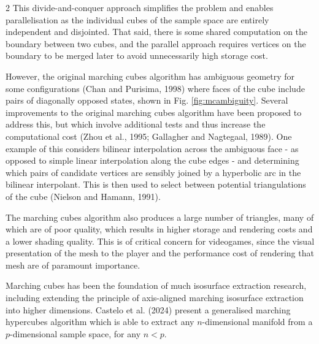 \documentclass[]{article}
\newenvironment{singlecolfigure}
  {\par\medskip\noindent\minipage{\linewidth}}
  {\endminipage\par\medskip}
\begin{document}
\begin{multicols}{2}
This divide-and-conquer approach simplifies the problem and enables parallelisation as the individual cubes of the sample space are entirely independent and disjointed. That said, there is some shared computation on the boundary between two cubes, and the parallel approach requires vertices on the boundary to be merged later to avoid unnecessarily high storage cost.

However, the original marching cubes algorithm has ambiguous geometry for some configurations (Chan and Purisima, 1998) where faces of the cube include pairs of diagonally opposed states, shown in Fig. \ref{fig:mcambiguity}. Several improvements to the original marching cubes algorithm have been proposed to address this, but which involve additional tests and thus increase the computational cost (Zhou et al., 1995; Gallagher and Nagtegaal, 1989). One example of this considers bilinear interpolation across the ambiguous face - as opposed to simple linear interpolation along the cube edges - and determining which pairs of candidate vertices are sensibly joined by a hyperbolic arc in the bilinear interpolant. This is then used to select between potential triangulations of the cube (Nielson and Hamann, 1991).

\begin{singlecolfigure}
    \centering
    
    \label{fig:mcambiguity}
\end{singlecolfigure}

\FloatBarrier

The marching cubes algorithm also produces a large number of triangles, many of which are of poor quality, which results in higher storage and rendering costs and a lower shading quality. This is of critical concern for videogames, since the visual presentation of the mesh to the player and the performance cost of rendering that mesh are of paramount importance.

Marching cubes has been the foundation of much isosurface extraction research, including extending the principle of axis-aligned marching isosurface extraction into higher dimensions. Castelo et al. (2024) present a generalised marching hypercubes algorithm which is able to
extract any $n$-dimensional manifold from a $p$-dimensional sample space, for any $n < p$.


\end{multicols}
\end{document}
